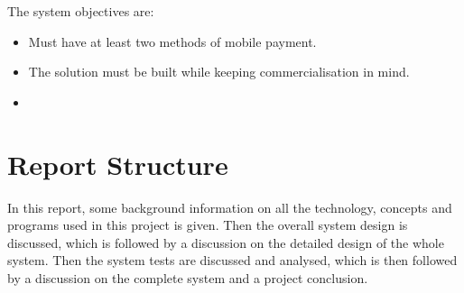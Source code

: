 The system objectives are:

\begin{itemize}
  \item Must have at least two methods of mobile payment.
  \item The solution must be built while keeping commercialisation in mind.
  \item 
\end{itemize}

\section{Report Structure}

In this report, some background information on all the technology, concepts and programs used
in this project is given. Then the overall system design is discussed, which is followed by
a discussion on the detailed design of the whole system. Then the system tests are discussed
and analysed, which is then followed by a discussion on the complete system and a
project conclusion.
